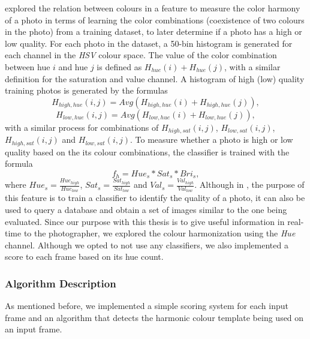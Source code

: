 \citeauthor{luo2008photo} explored the relation between colours \cite{luo2008photo} in a feature to measure the color harmony of a photo in terms of learning the color combinations (coexistence of two colours in the photo) from a training dataset, to later determine if a photo has a high or low quality.
For each photo in the dataset, a 50-bin histogram is generated for each channel in the \emph{HSV} colour space. The value of the color combination between hue $i$ and hue $j$ is defined as $H_{hue}(i) + H_{hue}(j)$, with a similar definition for the saturation and value channel. A histogram of high (low) quality training photos is generated by the formulas
\begin{equation}
H_{high,hue}(i,j) = Avg(H_{high,hue}(i)+H_{high,hue}(j)),
\end{equation}
\begin{equation}
H_{low,hue}(i,j) = Avg(H_{low,hue}(i)+H_{low,hue}(j)),
\end{equation}
with a similar process for combinations of $H_{high,sat}(i,j)$, $H_{low,sat}(i,j)$, $H_{high,sat}(i,j)$ and $H_{low,sat}(i,j)$.
To measure whether a photo is high or low quality based on the its colour combinations, the classifier is trained with the formula
\begin{equation}
f_{h} = Hue_{s}*Sat_{s}*Bri_{s},
\end{equation}
where $Hue_{s} = \frac{Hue_{high}}{Hue_{low}}$, $Sat_{s} = \frac{Sat_{high}}{Sat_{low}}$ and $Val_{s} = \frac{Val_{high}}{Val_{low}}$.
Although in \cite{luo2008photo}, the purpose of this feature is to train a classifier to identify the quality of a photo, it can also be used to query a database and obtain a set of images similar to the one being evaluated. Since our purpose with this thesis is to give useful information in real-time to the photographer, we explored the colour harmonization using the \emph{Hue} channel. Although we opted to not use any classifiers, we also implemented a score to each frame based on its hue count.

\subsubsection{Algorithm Description}
As mentioned before, we implemented a simple scoring system for each input frame and an algorithm that detects the harmonic colour template being used on an input frame.

